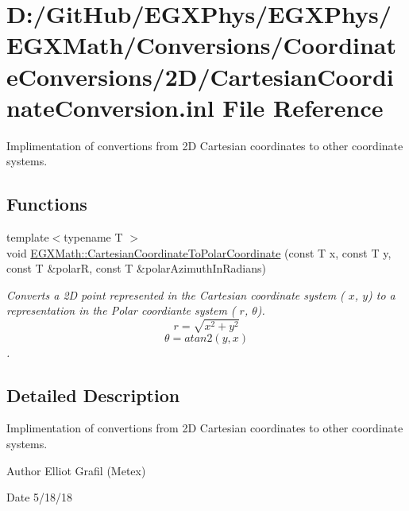 \hypertarget{_cartesian_coordinate_conversion_8inl}{}\section{D\+:/\+Git\+Hub/\+E\+G\+X\+Phys/\+E\+G\+X\+Phys/\+E\+G\+X\+Math/\+Conversions/\+Coordinate\+Conversions/2\+D/\+Cartesian\+Coordinate\+Conversion.inl File Reference}
\label{_cartesian_coordinate_conversion_8inl}


Implimentation of convertions from 2D Cartesian coordinates to other coordinate systems.  


\subsection*{Functions}
\begin{DoxyCompactItemize}
\item 
{\footnotesize template$<$typename T $>$ }\\void \mbox{\hyperlink{group___e_g_x_math-_conversions-_coordinate_conversions-2_d-_cartesian_ga01ead70b7b75d7ad0f80776c8c254897}{E\+G\+X\+Math\+::\+Cartesian\+Coordinate\+To\+Polar\+Coordinate}} (const T x, const T y, const T \&polarR, const T \&polar\+Azimuth\+In\+Radians)
\begin{DoxyCompactList}\small\item\em Converts a 2D point represented in the Cartesian coordinate system ( $x$, $y$) to a representation in the Polar coordiante system ( $r$, $\theta$). \[ r = \sqrt{x^2+y^2} \] \[ \theta = atan2(y,x) \]. \end{DoxyCompactList}\end{DoxyCompactItemize}


\subsection{Detailed Description}
Implimentation of convertions from 2D Cartesian coordinates to other coordinate systems. 

\begin{DoxyAuthor}{Author}
Elliot Grafil (Metex) 
\end{DoxyAuthor}
\begin{DoxyDate}{Date}
5/18/18 
\end{DoxyDate}
